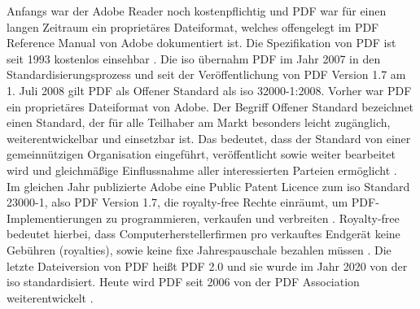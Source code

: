 Anfangs war der Adobe Reader noch kostenpflichtig und PDF war für einen langen Zeitraum ein proprietäres Dateiformat, welches offengelegt im PDF Reference Manual von Adobe dokumentiert ist. Die Spezifikation von PDF ist seit 1993 kostenlos einsehbar \cite{wiki-pdf-engl}. Die \gls{iso} übernahm PDF im Jahr 2007 in den Standardisierungsprozess und seit der Veröffentlichung von PDF Version 1.7 am 1. Juli 2008 gilt PDF als Offener Standard als \gls{iso} 32000-1:2008\cite{wiki-pdf-de, wiki-pdf-engl}. Vorher war PDF ein proprietäres Dateiformat von Adobe. Der Begriff Offener Standard bezeichnet einen Standard, der für alle Teilhaber am Markt besonders leicht zugänglich, weiterentwickelbar und einsetzbar ist. Das bedeutet, dass der Standard von einer gemeinnützigen Organisation eingeführt, veröffentlicht sowie weiter bearbeitet wird und gleichmäßige Einflussnahme aller interessierten Parteien ermöglicht \cite{wiki-standard}. \\
Im gleichen Jahr publizierte Adobe eine Public Patent Licence zum \gls{iso} Standard 23000-1, also PDF Version 1.7, die royalty-free Rechte einräumt, um PDF-Implementierungen zu programmieren, verkaufen und verbreiten \cite{wiki-pdf-engl}. Royalty-free bedeutet hierbei, dass Computerherstellerfirmen pro verkauftes Endgerät keine Gebühren (royalties), sowie keine fixe Jahrespauschale bezahlen müssen \cite{wiki-roy-free}. Die letzte Dateiversion von PDF heißt PDF 2.0 und sie wurde im Jahr 2020 von der \gls{iso} standardisiert. Heute wird PDF seit 2006 von der PDF Association weiterentwickelt \cite{wiki-pdf-de}. 










